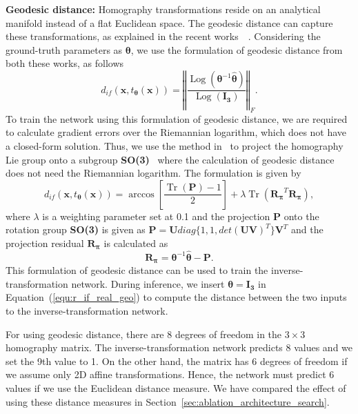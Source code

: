 \documentclass[final]{cvpr}
\DeclareMathOperator{\Tr}{Tr}
\DeclareMathOperator{\Log}{Log}
\begin{document}
\textbf{Geodesic distance:} Homography transformations reside on an analytical manifold instead of a flat Euclidean space. The geodesic distance can capture these transformations, as explained in the recent works~\cite{aetv2}~\cite{liegroups}. Considering the ground-truth parameters as $\boldsymbol{\theta}$, we use the formulation of geodesic distance from both these works, as follows 
\begin{equation}\label{equ:d_if_geo}
   d_{if}(\boldsymbol{x}, t_{\boldsymbol{\theta}}(\boldsymbol{x})) = \left\Vert \frac{\Log(\boldsymbol{\theta}^{-1}\hat{\boldsymbol{\theta}})}{\Log(\boldsymbol{I_{3}})} \right\Vert_{F} .
\end{equation}
To train the network using this formulation of geodesic distance, we are required to calculate gradient errors over the Riemannian logarithm, which does not have a closed-form solution. Thus, we use the method in~\cite{aetv2} to project the homography Lie group onto a subgroup \textbf{SO(3)}~\cite{taylor1994minimization} where the calculation of geodesic distance does not need the Riemannian logarithm. The formulation is given by
\begin{equation}\label{equ:d_if_real_geo}
   d_{if}(\boldsymbol{x}, t_{\boldsymbol{\theta}}(\boldsymbol{x})) = \arccos\left[\frac{\Tr{(\boldsymbol{P})}-1}{2} \right] + \lambda \Tr{(\boldsymbol{R_{\pi}}^{T} \boldsymbol{R_{\pi}})}, 
\end{equation}
where $\lambda$ is a weighting parameter set at 0.1 and the projection $\boldsymbol{P}$ onto the rotation group \textbf{SO(3)} is given as 
\( \boldsymbol{P} = \boldsymbol{U} diag\{1, 1, det(\boldsymbol{U}\boldsymbol{V})^{T}\}\boldsymbol{V}^{T} 
\) and the projection residual $\boldsymbol{R_{\pi}}$ is calculated as
\begin{equation}\label{equ:r_if_real_geo}
   \boldsymbol{R_{\pi}} = \boldsymbol{\theta}^{-1}\hat{\boldsymbol{\theta}} - \boldsymbol{P}.
\end{equation}
This formulation of geodesic distance can be used to train the inverse-transformation network. During inference, we insert $\boldsymbol{\theta} = \boldsymbol{I_{3}}$ in Equation~(\ref{equ:r_if_real_geo}) to compute the distance between the two inputs to the inverse-transformation network.

For using geodesic distance, there are 8 degrees of freedom in the $3\times3$ homography matrix. The inverse-transformation network predicts 8 values and we set the 9th value to 1. 
On the other hand, the matrix has 6 degrees of freedom if we assume only 2D affine transformations. Hence, the network must predict 6 values if we use the Euclidean distance measure. We have compared the effect of using these distance measures in Section~\ref{sec:ablation_architecture_search}.
\end{document}
